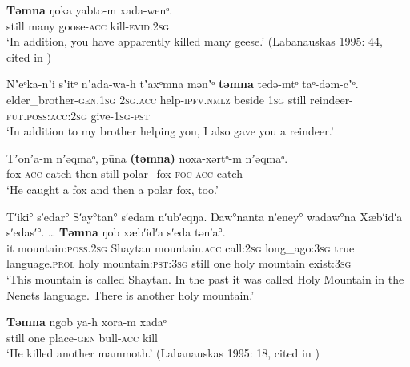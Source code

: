 	\begin{exe}
		\ex
		\gll \textbf{Təmna} ŋoka yabto-m xada-wenᵒ.\\
		still many goose-\textsc{acc} kill-\textsc{evid}.2\textsc{sg}\\
		\glt \lq In addition, you have apparently killed many geese.' (Labanauskas 1995: 44, cited in \cite[186]{Nikolaeva2014})
		
		\ex
		\gll Nʼeᵒka-nʼi sʼitᵒ nʼada-wa-h tʼaxᵒmna mənʼᵒ \textbf{təmna} tedə-mtᵒ taᵒ-dəm-cʼᵒ.\\
		elder\_brother-\textsc{gen}.1\textsc{sg} 2\textsc{sg}.\textsc{acc} help-\textsc{ipfv}.\textsc{nmlz} beside 1\textsc{sg} still reindeer-\textsc{fut.poss}:\textsc{acc}:2\textsc{sg} give-1\textsc{sg}-\textsc{pst}\\
		\glt \lq In addition to my brother helping you, I also gave you a reindeer.' \parencite[371]{Nikolaeva2014}
 
 	\ex\label{exAppendixTundraNenetsAlso3}
	 \gll Tʼonʼa-m nʼəqmaᵒ, pūna \textbf{(təmna)} noxa-xərtᵒ-m nʼəqmaᵒ.\\
	fox-\textsc{acc} catch then \phantom{\lq}still polar\_fox-\textsc{foc}-\textsc{acc} catch\\
	\glt \lq He caught a fox and then a polar fox, too.' \parencite[129]{Nikolaeva2014}


			\ex
		\gll Tʹiki° sʹedar° Sʹay°tan° sʹedam nʹubʹeqŋa. Ŋaw°nanta nʹeney° wadaw°na Xæbʹidʹa sʹedasʹ°. … \textbf{Tǝmna} ŋob xæbʹidʹa sʹeda tǝnʹa°.\\
		it mountain:\textsc{poss}.2\textsc{sg} Shaytan mountain.\textsc{acc} call:2\textsc{sg} long\_ago:3\textsc{sg} true language.\textsc{prol} holy mountain:\textsc{pst}:3\textsc{sg} {} still one holy mountain exist:3\textsc{sg}\\
		\glt \lq This mountain is called Shaytan. In the past it was called Holy Mountain in the Nenets language. There is another holy mountain.'
\parencite[The holy mountains]{NikolaevaEtAl2019}
		
		\ex 
		\gll \textbf{Təmna} ngob ya-h xora-m xadaᵒ\\
		still one place-\textsc{gen}	 bull-\textsc{acc} kill\\
		\glt \lq He killed another mammoth.' (Labanauskas 1995: 18, cited in \cite[186]{Nikolaeva2014})
\end{exe}

